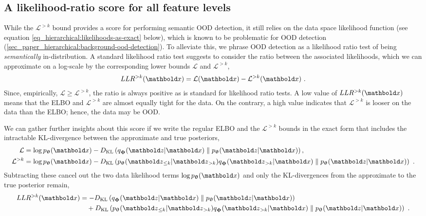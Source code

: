{\subsection{A likelihood-ratio score for all feature levels}
While the $\mathcal{L}^{>k}$ bound provides a score for performing semantic OOD detection, it still relies on the data space likelihood function (see equation \cref{eq_hierarchical:likelihoods-as-exact} below), which is known to be problematic for OOD detection (\cref{sec_paper_hierarchical:background-ood-detection}). To alleviate this, we phrase OOD detection as a likelihood ratio test of being \emph{semantically} in-distribution.
A standard likelihood ratio test \parencite{buse_likelihood_1982} suggests to consider the ratio between the associated likelihoods, which we can approximate on a log-scale by the corresponding lower bounds $\mathcal{L}$ and $\mathcal{L}^{>k}$,
\begin{equation}\label{eq_hierarchical:llr-as-difference-in-likelihoods}
    LLR^{>k}(\xb) = \mathcal{L}(\xb) - \mathcal{L}^{>k}(\xb) \ .
\end{equation}
Since, empirically, $\mathcal{L}\geq\mathcal{L}^{>k}$, the ratio is always positive as is standard for likelihood ratio tests.
A low value of $LLR^{>k}(\xb)$ means that the ELBO and $\mathcal{L}^{>k}$ are almost equally tight for the data.
On the contrary, a high value indicates that $\mathcal{L}^{>k}$ is looser on the data than the ELBO; hence, the data may be OOD.


We can gather further insights about this score if we write the regular ELBO and the $\mathcal{L}^{>k}$ bounds in the exact form that includes the intractable KL-divergence between the approximate and true posteriors,
\begin{align}
    \mathcal{L}      &= \log p_\thetab(\xb) - D_{\mathrm{KL}}\left( q_\phib(\zb|\xb) \parallel p_\thetab(\zb|\xb)\right), \label{eq_hierarchical:likelihoods-as-exact} \\ 
    \mathcal{L}^{>k} &= \log p_\thetab(\xb) - D_{\mathrm{KL}}\left( p_\thetab(\zb_{\leq k }|\zb_{>k}) q_\phib(\zb_{>k}|\xb) \parallel p_\thetab(\zb|\xb)\right) \nonumber \ .
\end{align}
Subtracting these cancel out the two data likelihood terms $\log p_\thetab(\xb)$ and only the KL-divergences from the approximate to the true posterior remain,
\begin{align}
    LLR^{>k}(\xb) &= - D_{\mathrm{KL}}\left( q_\phib(\zb|\xb) \parallel p_\thetab(\zb|\xb)\right) \\
                 &\quad + D_{\mathrm{KL}}\left( p_\thetab(\zb_{\leq k}|\zb_{>k}) q_\phib(\zb_{>k}|\xb) \parallel p_\thetab(\zb|\xb)\right) \ . \notag
\end{align}\label{eq_hierarchical:llr-as-kls}

}

